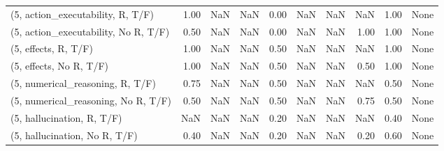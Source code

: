 \begin{table*}[h!]
\begin{adjustbox}{width=2\columnwidth,center}
\begin{tabular}{lrrr|rrr|rrr}
(5, action\_executability, R, T/F)    &                      1.00 &                   NaN &                       NaN &                          0.00 &                       NaN &                           NaN &                                    NaN &                               1.00 &                                  None \\
(5, action\_executability, No R, T/F) &                      0.50 &                   NaN &                       NaN &                          0.00 &                       NaN &                           NaN &                                   1.00 &                               1.00 &                                  None \\
(5, effects, R, T/F)                 &                      1.00 &                   NaN &                       NaN &                          0.50 &                       NaN &                           NaN &                                    NaN &                               1.00 &                                  None \\
(5, effects, No R, T/F)              &                      1.00 &                   NaN &                       NaN &                          0.50 &                       NaN &                           NaN &                                   0.50 &                               1.00 &                                  None \\
(5, numerical\_reasoning, R, T/F)     &                      0.75 &                   NaN &                       NaN &                          0.50 &                       NaN &                           NaN &                                    NaN &                               0.50 &                                  None \\
(5, numerical\_reasoning, No R, T/F)  &                      0.50 &                   NaN &                       NaN &                          0.50 &                       NaN &                           NaN &                                   0.75 &                               0.50 &                                  None \\
(5, hallucination, R, T/F)           &                       NaN &                   NaN &                       NaN &                          0.20 &                       NaN &                           NaN &                                    NaN &                               0.40 &                                  None \\
(5, hallucination, No R, T/F)        &                      0.40 &                   NaN &                       NaN &                          0.20 &                       NaN &                           NaN &                                   0.20 &                               0.60 &                                  None \\

\end{tabular}
\end{adjustbox}
\end{table*}
